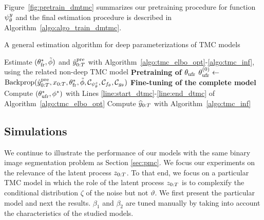 Figure~\ref{fig:pretrain_dmtmc}
 summarizes our pretraining procedure for function $\psi^{y}_{\theta}$ and 
 the final estimation procedure is described in Algorithm~\ref{algo:algo_train_dmtmc}.



\begin{algorithm}[htbp!]
  \caption{A general estimation algorithm for deep parameterizations of TMC models}
  \label{algo:algo_train_dmtmc}
  \begin{algorithmic}[1]
  \State Estimate $(\theta_{\mathrm{fr}}^*,\tilde{\phi})$ and $\hat{y}_{0:T}^{\mathrm{pre}}$ with Algorithm~\ref{algo:tmc_elbo_opt}-\ref{algo:tmc_inf}, using the related non-deep TMC model 
  \Statex \textbf{Pretraining of $\theta_{\mathrm{ufr}}$}  
  \State $\theta_{\mathrm{ufr}}^{(0)} \leftarrow$ ${\rm Backprop}(\hat{y}_{0:T}^{\mathrm{pre}},x_{0:T},\theta_{\mathrm{fr}}^*,\tilde{\phi},\mathcal{C}_{\psi^{z}_{\theta}}, \mathcal{C}_{f_{\theta}}, \mathcal{C}_{g_{\theta}})$
  \Statex \textbf{Fine-tuning of the complete model} 
  \State Compute $(\theta_{\mathrm{ufr}}^{*}, \phi^{*})$ with Lines \ref{line:start_dtmc}-\ref{line:end_dtmc} of Algorithm~\ref{algo:tmc_elbo_opt}
  \State Compute $\widehat{y}_{0:T}$ with Algorithm~\ref{algo:tmc_inf}
  \end{algorithmic}
\end{algorithm}


\subsection{Simulations}
We continue to illustrate 
the performance of our models with the same 
binary image segmentation problem as
Section \ref{sec:pmc}.
We focus our experiments on the relevance
of the latent process $z_{0:T}$. 
To that end, we focus on a particular TMC model in which the role of the latent process 
$z_{0:T}$ is to complexify the conditional distribution $\zeta$ of the noise but not $\vartheta$.
We first present the particular model and next the results. 
$\beta_1$ and $\beta_2$ are tuned manually
by taking into account the characteristics 
of the studied models.


